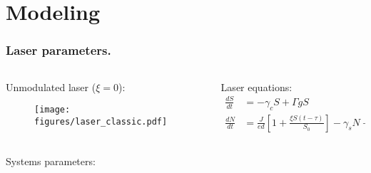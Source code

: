 \section{Modeling}

\begin{frame}
  \frametitle{Laser parameters.}
  \begin{columns}
    \begin{column}{.4\linewidth}
      Unmodulated laser ($\xi = 0$):
    \begin{figure}
        \centering
        \texttt{[image: figures/laser\_classic.pdf]}
    \end{figure}
    
    \end{column}
    \begin{column}{.6\linewidth}
      Laser equations:
      \begin{align*}
        \frac{d S}{d t}&=-\gamma_{c} S+\Gamma g S \\
        \frac{d N}{d t}&=\frac{J}{e d}\left[1+\frac{\xi S(t-\tau)}{S_{0}}\right]-\gamma_{s} N-g S
      \end{align*}
    \end{column}
  \end{columns}

  Systems parameters:
  \begin{itemize}
  \end{itemize}
  
\end{frame}

